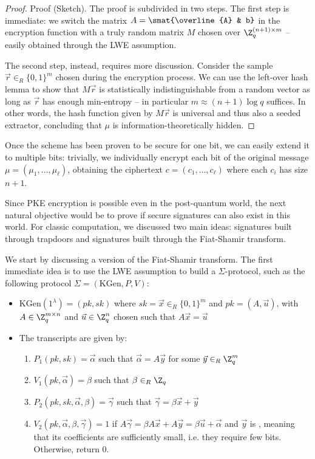\documentclass[a4paper, 12pt]{report}
\begin{document}
    \begin{proof}{Proof (Sketch).}
        The proof is subdivided in two steps. The first step is immediate: we  switch the matrix $A = \smat{\overline{A} & b}$ in the encryption function with a truly random matrix $M$ chosen over $\Z_q^{(n+1) \times m}$ -- easily obtained through the LWE assumption.

        The second step, instead, requires more discussion. Consider the sample $\vec r \in_R \{0,1\}^m$ chosen during the encryption process. We can use the left-over hash lemma to show that $M \vec{r}$ is statistically indistinguishable from a random vector as long as $\vec r$ has enough min-entropy -- in particular $m \approx (n+1) \log q$ suffices. In other words, the hash function given by $M \vec r$ is universal and thus also a seeded extractor, concluding that $\mu$ is information-theoretically hidden.
    \end{proof}

    Once the scheme has been proven to be secure for one bit, we can easily extend it to multiple bits: trivially, we individually encrypt each bit of the original message $\mu = (\mu_1, \ldots, \mu_\ell)$, obtaining the ciphertext $c = (c_1, \ldots, c_\ell)$ where each $c_i$ has size $n+1$.

    Since PKE encryption is possible even in the post-quantum world, the next natural objective would be to prove if secure signatures can also exist in this world. For classic computation, we discussed two main ideas: signatures built through trapdoors and signatures built through the Fiat-Shamir transform. 

    We start by discussing a  version of the Fiat-Shamir transform. The first immediate idea is to use the LWE assumption to build a $\Sigma$-protocol, such as the following protocol $\Sigma = (\mathrm{KGen}, P, V)$:
    \begin{itemize}
        \item $\mathrm{KGen}(1^\lambda) = (pk, sk)$ where $sk = \vec x \in_R \{0,1\}^m$ and $pk = (A, \vec u)$, with $A \in \Z_q^{m \times n}$ and $\vec u \in \Z_q^n$ chosen such that $A \vec x = \vec u$
        \item The transcripts are given by:
        \begin{enumerate}
            \item $P_1(pk,sk) = \vec \alpha$ such that $\vec \alpha = A \vec y$ for some $\vec y \in_R \Z_q^m$
            \item $V_1(pk, \vec \alpha) = \beta$ such that $\beta \in_R \Z_q$
            \item $P_2(pk,sk,\vec \alpha, \beta) = \vec \gamma$ such that $\vec\gamma = \beta \vec x + \vec y$
            \item $V_2(pk, \vec \alpha, \beta, \vec \gamma) = 1$ if $A \vec \gamma = \beta A \vec x + A \vec y =\beta \vec u + \vec \alpha$ and $\vec y$ is , meaning that its coefficients are sufficiently small, i.e. they require few bits. Otherwise, return $0$.
        \end{enumerate}
    \end{itemize}
\end{document}
